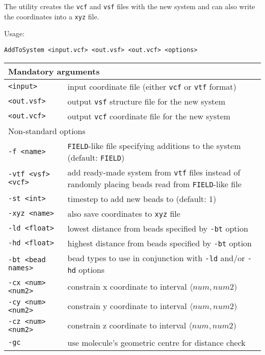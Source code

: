 The utility creates the \texttt{vcf} and \texttt{vsf} files with the new
system and can also write the coordinates into a \texttt{xyz} file.

Usage:

\vspace{1em}
\noindent
\texttt{AddToSystem <input.vcf> <out.vsf> <out.vcf> <options>}

\vspace{1em}
\noindent
\begin{longtable}{p{}p{}}
  \toprule
  \multicolumn{2}{l}{Mandatory arguments} \\
  \midrule
  \texttt{<input>} & input coordinate file (either \texttt{vcf} or
    \texttt{vtf} format) \\
  \texttt{<out.vsf>} & output \texttt{vsf} structure file for the new system \\
  \texttt{<out.vcf>} & output \texttt{vcf} coordinate file for the new
  system \\
  \toprule
  \multicolumn{2}{l}{Non-standard options} \\
  \midrule
  \texttt{-f <name>} & \texttt{FIELD}-like file specifying additions to the
    system (default: \texttt{FIELD}) \\
  \texttt{-vtf <vsf> <vcf>} & add ready-made system from \texttt{vtf} files
    instead of randomly placing beads read from \texttt{FIELD}-like file \\
  \texttt{-st <int>} & timestep to add new beads to (default: 1) \\
  \texttt{-xyz <name>} & also save coordinates to \texttt{xyz} file \\
  \texttt{-ld <float>} & lowest distance from beads specified by
    \texttt{-bt} option \\
  \texttt{-hd <float>} & highest distance from beads specified by
    \texttt{-bt} option \\
  \texttt{-bt <bead names>} & bead types to use in conjunction with
    \texttt{-ld} and/or \texttt{-hd} options \\
  \texttt{-cx <num> <num2>} & constrain x coordinate to interval
    $\langle num, num2)$ \\
  \texttt{-cy <num> <num2>} & constrain y coordinate to interval
    $\langle num, num2)$ \\
  \texttt{-cz <num> <num2>} & constrain z coordinate to interval
    $\langle num, num2)$ \\
  \texttt{-gc} & use molecule's geometric centre for distance check \\
  \bottomrule
\end{longtable}
